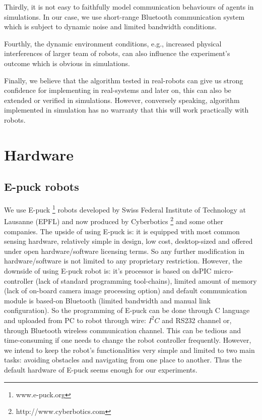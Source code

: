 Thirdly, it is not easy to faithfully model communication behaviours of agents in simulations. In our case, we use short-range Bluetooth communication system which is subject to dynamic noise and limited bandwidth conditions. 

Fourthly, the dynamic environment conditions, e.g., increased physical interferences of larger team of robots, can also influence the experiment's outcome which is obvious in simulations.

Finally, we believe that the algorithm tested in real-robots can give us strong confidence for implementing in real-systems and later on, this can also be extended or verified in simulations. However, conversely speaking, algorithm implemented in simulation has no warranty that this will work practically with robots.
\section{Hardware}
\subsection{E-puck robots}
We use E-puck \footnote{www.e-puck.org} robots developed by Swiss Federal Institute of Technology at Lausanne (EPFL) and now produced by Cyberbotics \footnote{http://www.cyberbotics.com} and some other companies. The upside of using E-puck is: it is equipped with most common sensing hardware, relatively simple in design, low cost, desktop-sized and offered under open hardware/software licensing terms. So any further modification in hardware/software is not limited to any proprietary restriction. However, the  downside of using E-puck robot  is:  it's  processor is based on dsPIC micro-controller (lack of standard programming tool-chains), limited amount of memory (lack of on-board camera image processing option) and default  communication module is based-on Bluetooth (limited bandwidth and manual link configuration). So the programming of E-puck can be done through C language and uploaded from PC to robot through wire: $I^{2}C$ and RS232 channel or, through Bluetooth wireless communication channel. This can be tedious and time-consuming if  one needs to change the robot controller frequently. However, we intend to keep the robot's functionalities very simple and limited to two main tasks: avoiding obstacles and navigating from one place to another. Thus the default hardware of E-puck seems enough for our experiments. 

